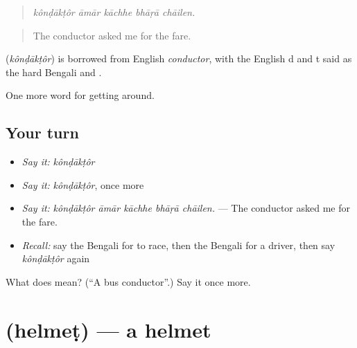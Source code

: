 \begin{quote}
    
\end{quote}

\begin{quote}
\emph{kônḍākṭôr āmār kāchhe bhāṛā chāilen.}
\end{quote}

\begin{quote}
The conductor asked me for the fare.
\end{quote}

\begin{cousinweb}
\textbf{} (\emph{kônḍākṭôr}) is borrowed from English \emph{conductor}, with the English d and t said as the hard Bengali  and .
\end{cousinweb}

\begin{grammarlens}[title={What you've built}]
One more word for getting around.
\end{grammarlens}

\subsection*{Your turn}
\begin{itemize}
\raggedright
  \item \emph{Say it:} \emph{kônḍākṭôr}
  \item \emph{Say it:} \emph{kônḍākṭôr}, once more
  \item \emph{Say it:} \emph{kônḍākṭôr āmār kāchhe bhāṛā chāilen.} — The conductor asked me for the fare.
  \item \emph{Recall:} say the Bengali for to race, then the Bengali for a driver, then say \emph{kônḍākṭôr} again
\end{itemize}

\begin{tcolorbox}[breakable,colback=teal!4,colframe=teal!35!black,title={Before you move on}]
What does  mean? (\textquotedblleft{}A bus conductor\textquotedblright{}.) Say it once more.
\end{tcolorbox}
\section[\texorpdfstring{\bn{হেলমেট} (helmeṭ)}{হেলমেট (helmeṭ)}]{ (helmeṭ) — a helmet}

\label{lesson:BN-C389-helmet}



